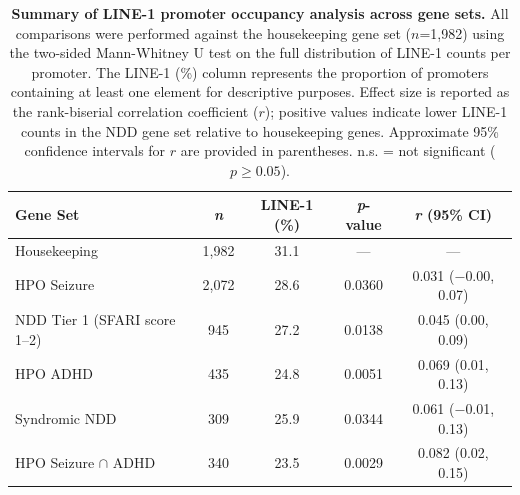 \documentclass[preprints,briefreport,submit,pdftex,oneauthor]{Definitions/mdpi}
\begin{document}

\begin{table}[H]
\centering
\caption{\textbf{Summary of LINE-1 promoter occupancy analysis across gene sets.} All comparisons were performed against the housekeeping gene set ($n$=1,982) using the two-sided Mann-Whitney U test on the full distribution of LINE-1 counts per promoter. The LINE-1 (\%) column represents the proportion of promoters containing at least one element for descriptive purposes.
Effect size is reported as the
rank-biserial correlation coefficient ($r$); positive values
indicate lower LINE-1 counts in the NDD gene set relative
to housekeeping genes.
Approximate 95\% confidence intervals
for $r$ are provided in parentheses. n.s.
= not significant
($p \geq 0.05$).}
\label{tab:main}
\small
\begin{tabularx}{\textwidth}{>{\raggedright\arraybackslash}Xcccc}
\toprule
\textbf{Gene Set} &
\textbf{\textit{n}} &
\textbf{LINE-1 (\%)} &
\textbf{\textit{p}-value} &
\textbf{\textit{r} (95\% CI)} \\
\midrule
Housekeeping
  & 1,982 & 31.1 & --- & --- \\
HPO Seizure
  & 2,072 & 28.6 & 0.0360 & 0.031 ($-$0.00, 0.07) \\
NDD Tier 1 (SFARI score 1--2)
  &   945 & 27.2 & 0.0138 & 0.045 (0.00, 0.09) \\
HPO ADHD
  &   435 & 24.8 & 0.0051 & 0.069 (0.01, 0.13) \\
Syndromic NDD
  &   309 & 25.9 & 0.0344 & 0.061 ($-$0.01, 0.13) \\
HPO Seizure $\cap$ ADHD
  &   340 & 23.5 & 0.0029 & 0.082 (0.02, 0.15) \\
\bottomrule
\end{tabularx}
\normalsize
\end{table}

\clearpage

\end{document}
